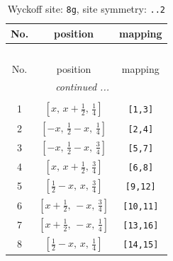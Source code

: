 \documentclass[fleqn,8pt]{jsarticle}
\begin{document}
\begin{longtable}{ccc}
\caption{Wyckoff site: {\tt 8g}, site symmetry: {\tt ..2}}
 \\
 \hline \hline
No. & position & mapping \\ \hline \endfirsthead

\multicolumn{2}{l}{\tablename\ \thetable{}} \\
 \hline \hline
No. & position & mapping \\ \hline \endhead

 \hline \hline
\multicolumn{2}{r}{\footnotesize\it continued ...} \\ \endfoot

 \hline \hline
\multicolumn{2}{r}{} \\ \endlastfoot

1 & $\left[ x,\, x + \frac{1}{2},\, \frac{1}{4} \right]$ & {\tt [1,3]} \\ \hline
2 & $\left[ - x,\, \frac{1}{2} - x,\, \frac{1}{4} \right]$ & {\tt [2,4]} \\ \hline
3 & $\left[ - x,\, \frac{1}{2} - x,\, \frac{3}{4} \right]$ & {\tt [5,7]} \\ \hline
4 & $\left[ x,\, x + \frac{1}{2},\, \frac{3}{4} \right]$ & {\tt [6,8]} \\ \hline
5 & $\left[ \frac{1}{2} - x,\, x,\, \frac{3}{4} \right]$ & {\tt [9,12]} \\ \hline
6 & $\left[ x + \frac{1}{2},\, - x,\, \frac{3}{4} \right]$ & {\tt [10,11]} \\ \hline
7 & $\left[ x + \frac{1}{2},\, - x,\, \frac{1}{4} \right]$ & {\tt [13,16]} \\ \hline
8 & $\left[ \frac{1}{2} - x,\, x,\, \frac{1}{4} \right]$ & {\tt [14,15]} \\
\end{longtable}
\renewcommand{\arraystretch}{1.2}
\end{document}
